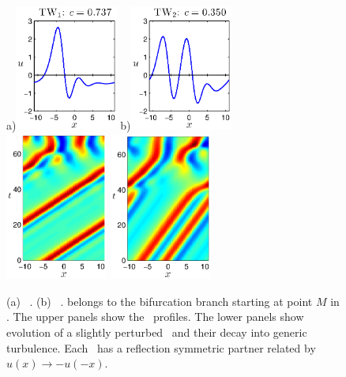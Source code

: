 \begin{figure}[t]
\begin{center}
a)\includegraphics[width=0.3\textwidth]{figs/ks22_TW1_profile.eps}
b)\includegraphics[width=0.3\textwidth]{figs/ks22_TW2_profile.eps}\\
\includegraphics[width=0.3\textwidth]{figs/ks22_TW1_orbit.eps}
\includegraphics[width=0.3\textwidth]{figs/ks22_TW2_orbit.eps}
\end{center}
\caption{
(a)
    \Reqv\ .
(b)
\Reqv\  .  
belongs to the bifurcation branch starting
at point $M$ in .
The upper panels show
the \reqva\ profiles. The lower panels show evolution
of a slightly perturbed \reqva\ and their decay into generic turbulence.
Each \reqv\ has a reflection symmetric partner related by 
 $u(x) \to -u(-x)$.
} \label{f:ks22TW}
\end{figure}

